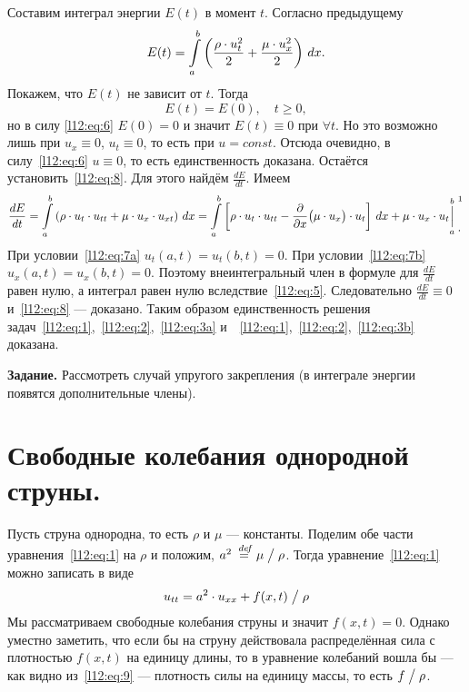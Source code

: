 \documentclass[12pt,a4paper,openany,fleqn]{book}
\newcommand {\defeq}{\stackrel{\hspace{0.09 cm}de\!f}{=}}
\newcommand {\eqdef}{\defeq}
\newcommand{\der}[2]{\ensuremath{\frac{d#1}{d#2}}}
\newcommand{\pder}[2]{\ensuremath{\frac{\partial#1}{\partial#2}}}
\theoremstyle{definition}
\begin{document}
Составим интеграл энергии $E(t)$ в момент $t$. Согласно предыдущему 
\begin{equation*}
	\hfill E(t)=\int\limits_a^b\left(\frac{\rho\cdot u^2_t}{2}+\frac{\mu\cdot u^2_x}{2}\right)\,dx.\hfill
\end{equation*} 
Покажем, что $E(t)$ не зависит от $t$. Тогда 
\begin{equation}
	\label{l12:eq:8}
	E(t)=E(0),\quad t\geqslant0,
\end{equation}
но в силу \eqref{l12:eq:6} $E(0)=0$ и значит $E(t)\equiv0$ при $\forall t$. Но это возможно лишь при $u_x\equiv0$, $u_t\equiv0$, то есть при $u=const$. Отсюда очевидно, в силу~\eqref{l12:eq:6} $u\equiv0$, то есть единственность доказана. Остаётся установить~\eqref{l12:eq:8}. Для этого найдём $\der{E}{t}$. Имеем 
\begin{equation*}
	\der{E}{t}=\int\limits_a^b\left(\rho\cdot u_t\cdot u_{tt}+\mu\cdot u_x\cdot u_{xt}\right)\,dx=\int\limits_a^b\left[\rho\cdot u_t\cdot u_{tt}-\pder{}{x}\big(\mu\cdot u_x\big)\cdot u_t\right]\,dx+\mu\cdot u_x\cdot u_t{\mathop{\Big|}\limits_a^b}\phantom{|}{\vphantom{\bigg|}}^{\footnotemark{}}_{\displaystyle.}
\end{equation*}
При условии~\eqref{l12:eq:7a} $u_t(a,t)=u_t(b,t)=0$. При условии~\eqref{l12:eq:7b} $u_x(a,t)=u_x(b,t)=0$. Поэтому внеинтегральный член в формуле для $\displaystyle\der{E}{t}$ равен нулю, а интеграл равен нулю вследствие~\eqref{l12:eq:5}. Следовательно $\displaystyle\der{E}{t}\equiv0$ и~\eqref{l12:eq:8} --- доказано. Таким образом единственность решения задач~\eqref{l12:eq:1},~\eqref{l12:eq:2},~\eqref{l12:eq:3a} и~~\eqref{l12:eq:1},~\eqref{l12:eq:2},~\eqref{l12:eq:3b} доказана.
\vspace{0.2cm}

\noindent\textbf{Задание. }Рассмотреть случай упругого закрепления (в интеграле энергии появятся дополнительные члены).

\section{Свободные колебания однородной струны.}
\label{lecture11section2}
Пусть струна однородна, то есть $\rho$ и $\mu$ --- константы. Поделим обе части уравнения~\eqref{l12:eq:1} на $\rho$ и положим, $a^2\eqdef{\mu}\bigm/{\rho}$. Тогда уравнение~\eqref{l12:eq:1} можно записать в виде
\begin{equation}
	\label{l12:eq:9}
	\hfill u_{tt}=a^2\cdot u_{xx}+f(x,t)\bigm/\rho\hfill
\end{equation}
Мы рассматриваем свободные колебания струны и значит $f(x,t)=0$. Однако уместно заметить, что если бы на струну действовала распределённая сила с плотностью $f(x,t)$ на единицу длины, то в уравнение колебаний вошла бы --- как видно из~\eqref{l12:eq:9} --- плотность силы на единицу массы, то есть $f\bigm/\rho$.
\end{document}
